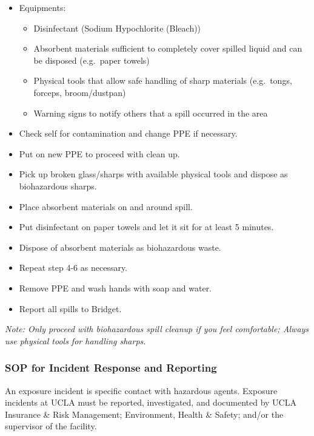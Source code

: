 \documentclass[]{book}
\providecommand{\tightlist}{%
  \setlength{\itemsep}{0pt}\setlength{\parskip}{0pt}}
\begin{document}
\begin{itemize}
\tightlist
\item
  Equipments:

  \begin{itemize}
  \tightlist
  \item
    Disinfectant (Sodium Hypochlorite (Bleach))
  \item
    Absorbent materials sufficient to completely cover spilled liquid and can be disposed (e.g.~paper towels)
  \item
    Physical tools that allow safe handling of sharp materials (e.g.~tongs, forceps, broom/dustpan)
  \item
    Warning signs to notify others that a spill occurred in the area
  \end{itemize}
\item
  Check self for contamination and change PPE if necessary.
\item
  Put on new PPE to proceed with clean up.
\item
  Pick up broken glass/sharps with available physical tools and dispose as biohazardous sharps.
\item
  Place absorbent materials on and around spill.
\item
  Put disinfectant on paper towels and let it sit for at least 5 minutes.
\item
  Dispose of absorbent materials as biohazardous waste.
\item
  Repeat step 4-6 as necessary.
\item
  Remove PPE and wash hands with soap and water.
\item
  Report all spills to Bridget.
\end{itemize}

\emph{Note: Only proceed with biohazardous spill cleanup if you feel comfortable;
Always use physical tools for handling sharps.}

\hypertarget{sop-for-incident-response-and-reporting}{%
\subsubsection{SOP for Incident Response and Reporting}\label{sop-for-incident-response-and-reporting}}

An exposure incident is specific contact with hazardous agents. Exposure incidents at UCLA must be reported, investigated, and documented by UCLA Insurance \& Risk Management; Environment, Health \& Safety; and/or the supervisor of the facility.
\end{document}
